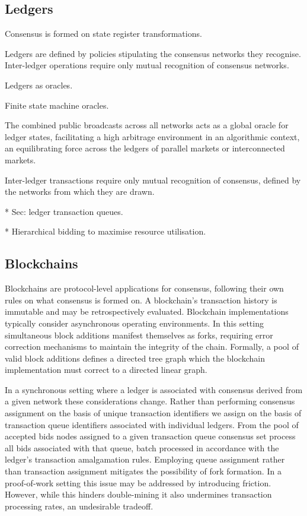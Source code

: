 \documentclass[twocolumn, aps, amsmath, amssymb, nofootinbib, superscriptaddress, longbibliography, floatfix, eqsecnum, rmp]{revtex4-2}
\begin{document}
\subsection{Ledgers}

Consensus is formed on state register transformations.

Ledgers are defined by policies stipulating the consensus networks they recognise. Inter-ledger operations require only mutual recognition of consensus networks.

Ledgers as oracles.

Finite state machine oracles.

The combined public broadcasts across all networks acts as a global oracle for ledger states, facilitating a high arbitrage environment in an algorithmic context, an equilibrating force across the ledgers of parallel markets or interconnected markets.

Inter-ledger transactions require only mutual recognition of consensus, defined by the networks from which they are drawn.

* Sec: ledger transaction queues.

* Hierarchical bidding to maximise resource utilisation.

\subsection{Blockchains}

Blockchains are protocol-level applications for consensus, following their own rules on what consensus is formed on. A blockchain's transaction history is immutable and may be retrospectively evaluated. Blockchain implementations typically consider asynchronous operating environments. In this setting simultaneous block additions manifest themselves as forks, requiring error correction mechanisms to maintain the integrity of the chain. Formally, a pool of valid block additions defines a directed tree graph which the blockchain implementation must correct to a directed linear graph.

In a synchronous setting where a ledger is associated with consensus derived from a given network these considerations change. Rather than performing consensus assignment on the basis of unique transaction identifiers we assign on the basis of transaction queue identifiers associated with individual ledgers. From the pool of accepted bids nodes assigned to a given transaction queue consensus set process all bids associated with that queue, batch processed in accordance with the ledger's transaction amalgamation rules. Employing queue assignment rather than transaction assignment mitigates the possibility of fork formation. In a proof-of-work setting this issue may be addressed by introducing friction. However, while this hinders double-mining it also undermines transaction processing rates, an undesirable tradeoff.
\end{document}
